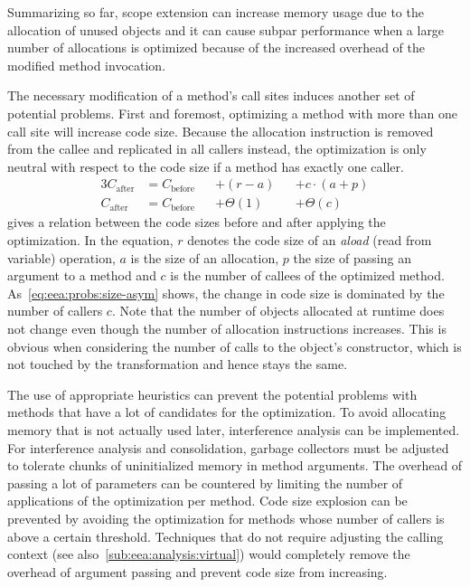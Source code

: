 		Summarizing so far, scope extension can increase memory usage due to the allocation of unused objects and it can
		cause subpar performance when a large number of allocations is optimized because of the increased overhead of the
		modified method invocation.

		The necessary modification of a method's call sites induces another set of potential problems. First and foremost,
		optimizing a method with more than one call site will increase code size. Because the allocation instruction is
		removed from the callee and replicated in all callers instead, the optimization is only neutral with respect to the
		code size if a method has exactly one caller.
		\begin{alignat}{3}
			C_\text{after}
				&= C_\text{before} &&+ (r - a)   &&+ c \cdot (a + p) \label{eq:eea:probs:size}\\
			C_\text{after}
				&= C_\text{before} &&+ \Theta(1) &&+ \Theta(c) \label{eq:eea:probs:size-asym}
		\end{alignat}
		 gives a relation between the code sizes before and after applying the optimization. In the
		equation, $r$ denotes the code size of an \emph{aload} (read from variable) operation, $a$ is the size of an
		allocation, $p$ the size of passing an argument to a method and $c$ is the number of callees of the optimized
		method. As~\cref{eq:eea:probs:size-asym} shows, the change in code size is dominated by the number of callers $c$.
		Note that the number of objects allocated at runtime does not change even though the number of allocation
		instructions increases. This is obvious when considering the number of calls to the object's constructor, which is
		not touched by the transformation and hence stays the same.

		The use of appropriate heuristics can prevent the potential problems with methods that have a lot of candidates for
		the optimization. To avoid allocating memory that is not actually used later, interference analysis can be
		implemented. For interference analysis and consolidation, garbage collectors must be adjusted to tolerate chunks of
		uninitialized memory in method arguments. The overhead of passing a lot of parameters can be countered by limiting
		the number of applications of the optimization per method. Code size explosion can be prevented by avoiding the
		optimization for methods whose number of callers is above a certain threshold. Techniques that do not require
		adjusting the calling context (see also~\cref{sub:eea:analysis:virtual}) would completely remove the overhead of
		argument passing and prevent code size from increasing.
